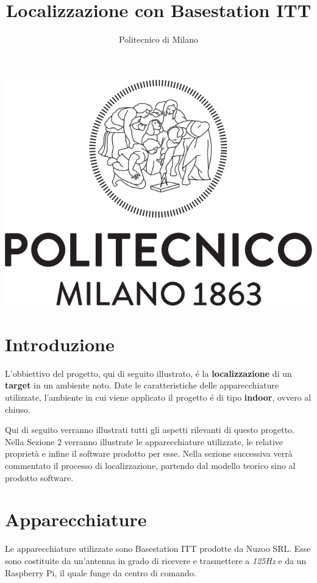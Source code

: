 \documentclass{article}
\title{Localizzazione con Basestation ITT}
\author{Politecnico di Milano}
\begin{document}
\maketitle

\begin{center}
\includegraphics[scale=0.4]{manual_imgs/Logo_Politecnico_Milano}
\end{center}

\pagebreak

\tableofcontents

\pagebreak


\section{Introduzione}
L'obbiettivo del progetto, qui di seguito illustrato, \'e la \textbf{localizzazione} di un \textbf{target}  in un ambiente noto.
Date le caratteristiche delle apparecchiature utilizzate, l'ambiente in cui viene applicato il progetto \'e di tipo \textbf{indoor}, ovvero al chiuso.

Qui di seguito verranno illustrati tutti gli aspetti rilevanti di questo progetto. Nella Sezione 2 verranno illustrate le apparecchiature utilizzate, le relative propriet\`a e infine il software prodotto per esse.
Nella sezione successiva verr\`a commentato il processo di localizzazione, partendo dal modello teorico sino al prodotto software.

\section{Apparecchiature}
Le apparecchiature utilizzate sono Basestation ITT prodotte da Nuzoo SRL. Esse sono costituite da un'antenna in grado di ricevere e trasmettere a \textit{125Hz} e da un Raspberry Pi, il quale funge da centro di comando.
\end{document}
